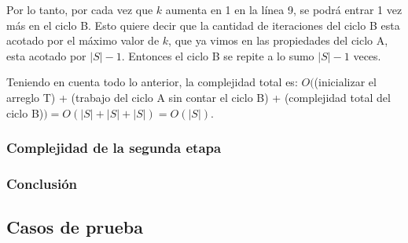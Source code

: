 Por lo tanto, por cada vez que $k$ aumenta en 1 en la línea 9, se podrá entrar 1 vez más en el ciclo B. Esto
quiere decir que la cantidad de iteraciones del ciclo B esta acotado por el máximo valor de $k$, que ya
vimos en las propiedades del ciclo A, esta acotado por $|S|-1$. Entonces el ciclo B se repite a lo sumo $|S|-1$
veces.

Teniendo en cuenta todo lo anterior, la complejidad total es:
$O($(inicializar el arreglo T) + (trabajo del ciclo A sin contar el ciclo B) + (complejidad total del ciclo B)$)
= O(|S| + |S| + |S|) = O(|S|)$.

\subsubsection{Complejidad de la segunda etapa}
\subsubsection{Conclusión}

\subsection{Casos de prueba}